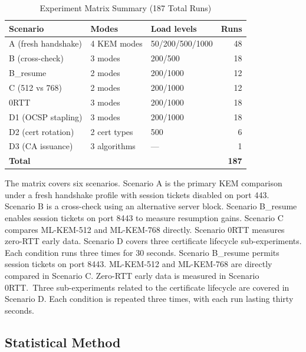 \documentclass[conference]{IEEEtran}
\begin{document}
\begin{table}[htbp]
\caption{Experiment Matrix Summary (187 Total Runs)}
\label{tab:matrix}
\begin{center}
\begin{tabular}{lllr}
\toprule
\textbf{Scenario} & \textbf{Modes} & \textbf{Load levels} & \textbf{Runs} \\
\midrule
A (fresh handshake)  & 4 KEM modes   & 50/200/500/1000 & 48 \\
B (cross-check)      & 3 modes       & 200/500         & 18 \\
B\_resume            & 2 modes       & 200/1000        & 12 \\
C (512 vs 768)       & 2 modes       & 200/1000        & 12 \\
0RTT                 & 3 modes       & 200/1000        & 18 \\
D1 (OCSP stapling)   & 3 modes       & 200/1000        & 18 \\
D2 (cert rotation)   & 2 cert types  & 500             &  6 \\
D3 (CA issuance)     & 3 algorithms  & —               & \phantom{0}1 \\
\midrule
\textbf{Total}       &               &                 & \textbf{187} \\
\bottomrule
\end{tabular}
\end{center}
\end{table}

The matrix covers six scenarios. Scenario A is the primary KEM comparison under a
fresh handshake profile with session tickets disabled on port 443. Scenario B is a
cross-check using an alternative server block. Scenario B\_resume enables session
tickets on port 8443 to measure resumption gains. Scenario C compares ML-KEM-512
and ML-KEM-768 directly. Scenario 0RTT measures zero-RTT early data. Scenario D
covers three certificate lifecycle sub-experiments. Each condition runs three times
for 30 seconds. Scenario B\_resume permits session tickets on port 8443. ML-KEM-512 and ML-KEM-768 are directly compared in Scenario C. Zero-RTT early data is measured in Scenario 0RTT. Three sub-experiments related to the certificate lifecycle are covered in Scenario D. Each condition is repeated three times, with each run lasting thirty seconds.

\subsection{Statistical Method}
\end{document}
